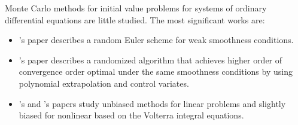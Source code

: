 \documentclass[a4paper,12pt]{article}
\begin{document}
\begin{related}
    Monte Carlo methods for initial value problems for systems of ordinary
    differential equations are little studied. The most significant works are:
    \begin{itemize}
        \item \citeauthor{jentzen_random_2009}'s \citeyear{jentzen_random_2009}
              \cite{jentzen_random_2009} paper describes a random Euler scheme for
              weak smoothness conditions.

        \item \citeauthor{daun_randomized_2011}'s \citeyear{daun_randomized_2011}
              \cite{daun_randomized_2011} paper describes a randomized algorithm that
              achieves higher order of convergence order optimal under the
              same smoothness conditions by using polynomial extrapolation and
              control variates.

        \item \citeauthor{ermakov_monte_2019}'s \citeyear{ermakov_monte_2019}
              \cite{ermakov_monte_2019}
              and \citeauthor{ermakov_monte_2021}'s \citeyear{ermakov_monte_2021}
              \cite{ermakov_monte_2021}
              papers study unbiased  methods
              for linear problems and slightly biased for nonlinear based
              on the Volterra integral equations.

    \end{itemize}



\end{related}


\end{document}
